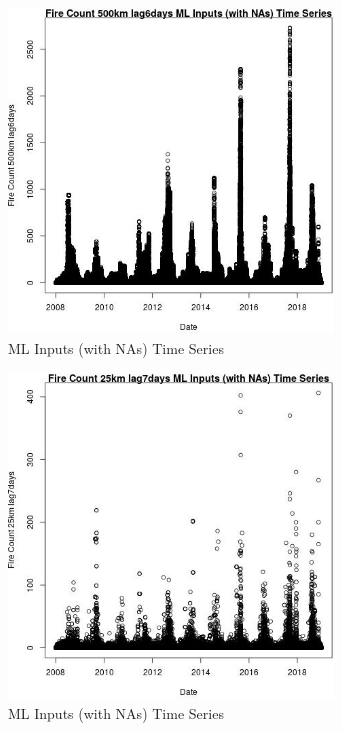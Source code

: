 \begin{figure} 
\centering  
\includegraphics[width=0.77\textwidth]{Code_Outputs/Report_ML_input_PM25_Step4_part_f_de_duplicated_aveswNAs_Fire_Count_500km_lag6daysvDate.jpg} 
\caption{\label{fig:Report_ML_input_PM25_Step4_part_f_de_duplicated_aveswNAsFire_Count_500km_lag6daysvDate}ML Inputs (with NAs) Time Series} 
\end{figure} 
 

\begin{figure} 
\centering  
\includegraphics[width=0.77\textwidth]{Code_Outputs/Report_ML_input_PM25_Step4_part_f_de_duplicated_aveswNAs_Fire_Count_25km_lag7daysvDate.jpg} 
\caption{\label{fig:Report_ML_input_PM25_Step4_part_f_de_duplicated_aveswNAsFire_Count_25km_lag7daysvDate}ML Inputs (with NAs) Time Series} 
\end{figure} 
 

